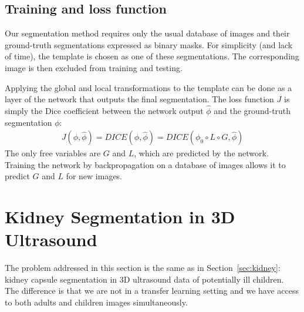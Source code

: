
\subsection{Training and loss function}
\label{ssec:seg_training}

Our segmentation method requires only the usual database of images and their ground-truth segmentations expressed as binary masks. For simplicity (and lack of time), the template is chosen as one of these segmentations. The corresponding image is then excluded from training and testing. 

Applying the global and local transformations to the template can be done as a layer of the network that outputs the final segmentation. The loss function $J$ is simply the Dice coefficient between the network output $\hat{\phi}$ and the ground-truth segmentation $\phi$:
\begin{align}
    J \left( \phi, \hat{\phi} \right) = DICE \left( \phi, \hat{\phi} \right)%
                                      = DICE \left( \phi_0 \circ L \circ G, \hat{\phi} \right)%
\end{align}
The only free variables are $G$ and $L$, which are predicted by the network. Training the network by backpropagation on a database of images allows it to predict $G$ and $L$ for new images. 

\section{Kidney Segmentation in 3D Ultrasound}
\label{sec:seg_data}

The problem addressed in this section is the same as in Section~\ref{sec:kidney}: kidney capsule segmentation in 3D ultrasound data of potentially ill children. The difference is that we are not in a transfer learning setting and we have access to both adults and children images simultaneously.

